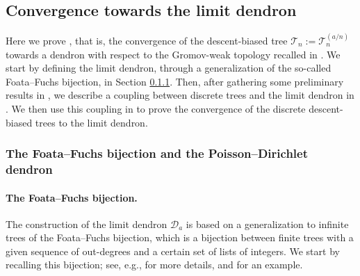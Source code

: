 \documentclass{article}
\theoremstyle{remark}
\newcommand{\cT}{\mathcal{T}}
\newcommand{\cD}{\mathcal{D}}
\begin{document}
\subsection{Convergence towards the limit dendron}
\label{ssec: limit dendron convergence}

Here we prove , that is, the convergence of the descent-biased tree $\cT_n := \cT_n^{(a/n)}$ towards a dendron with respect to the Gromov-weak topology recalled in . 
We start by defining the limit dendron, through a generalization of the so-called Foata--Fuchs bijection, in Section \ref{sssec:foata}. 
Then, after gathering some preliminary results in , we describe a coupling between discrete trees and the limit dendron in . 
We then use this coupling in  to prove the convergence of the discrete descent-biased trees to the limit dendron.


\subsubsection{The Foata--Fuchs bijection and the Poisson--Dirichlet dendron}
\label{sssec:foata}

\paragraph{The Foata--Fuchs bijection.}

The construction of the limit dendron $\cD_a$ is based on a generalization to infinite trees of the Foata--Fuchs bijection, which is a bijection between finite trees with a given sequence of out-degrees and a certain set of lists of integers. 
We start by recalling this bijection; see, e.g., \cite{Addario-Berry_Blanc-Renaudie_Donderwinkel_Maazoun_Martin_2023} for more details, and  for an example. 
\end{document}
